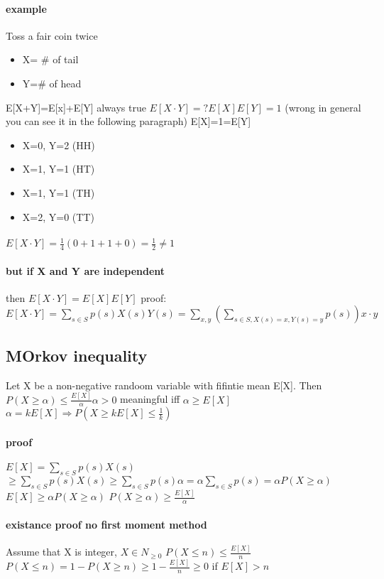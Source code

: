 \documentclass[a4paper,10pt]{article}
\begin{document}
\paragraph{example}
Toss a fair coin twice
\begin{itemize}
 \item X= \# of tail
 \item Y=\# of head
\end{itemize}
E[X+Y]=E[x]+E[Y] always true
\newline
$E[X\cdot Y]=?E[X]E[Y]=1$ (wrong in general you can see it in the following paragraph)
\newline
E[X]=1=E[Y]
\begin{itemize}
 \item X=0, Y=2 (HH)
 \item X=1, Y=1 (HT)
 \item X=1, Y=1 (TH)
 \item X=2, Y=0 (TT)
\end{itemize}
\paragraph{}
$E[X\cdot Y]=\frac{1}{4}(0+1+1+0)=\frac{1}{2}\neq 1$
\paragraph{but if X and Y are independent}
then $E[X\cdot Y]=E[X]E[Y]$
\newline
proof: $E[X\cdot Y]=\sum_{s\in S}p(s)X(s)Y(s)=\sum_{x,y}(\sum_{s\in S, X(s)=x,Y(s)=y}p(s))x\cdot y$
\subsection{MOrkov inequality}
Let X be a non-negative randoom variable with fifintie mean E[X]. Then 
\newline
$P(X\geq \alpha)\leq \frac{E[X]}{\alpha} \alpha >0$
\newline
meaningful iff $\alpha \geq E[X]$
\newline
$\alpha=kE[X]\Rightarrow P(X\geq kE[X]\leq \frac{1}{k})$
\paragraph{proof}
$E[X]=\sum_{s\in S}p(s)X(s)$
\newline
$\geq \sum_{s\in S}p(s)X(s)\geq \sum_{s\in S}p(s)\alpha=\alpha\sum_{s\in S}p(s)=\alpha P(X\geq \alpha)$
\newline
$E[X]\geq \alpha P(X\geq \alpha)$
\newline
$P(X\geq \alpha)\geq \frac{E[X]}{ \alpha}$
\paragraph{existance proof no first moment method }
Assume that X is integer, $X\in N_{\geq 0}$
\newline
$P(X\leq n)\leq \frac{E[X]}{n}$
\newline
$P(X\leq n)=1-P(X\geq n)\geq 1-\frac{E [X]}{n}\geq 0$ if $E[X]>n$
\end{document}
